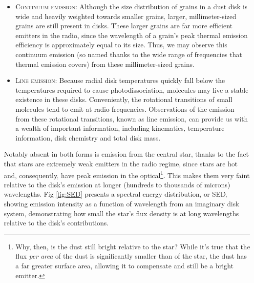 \begin{itemize}


  \item \textsc{Continuum emission}: Although the size distribution of grains in a dust disk is wide and heavily weighted towards smaller grains, larger, millimeter-sized grains are still present in disks. These larger grains are far more efficient emitters in the radio, since the wavelength of a grain's peak thermal emission efficiency is approximately equal to its size. Thus, we may observe this continuum emission (so named thanks to the wide range of frequencies that thermal emission covers) from these millimeter-sized grains.


  \item \textsc{Line emission}: Because radial disk temperatures quickly fall below the temperatures required to cause photodissociation, molecules may live a stable existence in these disks. Conveniently, the rotational transitions of small molecules tend to emit at radio frequencies. Observations of the emission from these rotational transitions, known as line emission, can provide us with a wealth of important information, including kinematics, temperature information, disk chemistry and total disk mass.
\end{itemize}


Notably absent in both forms is emission from the central star, thanks to the fact that stars are extremely weak emitters in the radio regime, since stars are hot and, consequently, have peak emission in the optical\footnote{Why, then, is the dust still bright relative to the star? While it's true that the flux \textit{per area} of the dust is significantly smaller than of the star, the dust has a far greater surface area, allowing it to compensate and still be a bright emitter.}. This makes them very faint relative to the disk's emission at longer (hundreds to thousands of microns) wavelengths. Fig \ref{fig:SED} \citep{Hughes2010} presents a spectral energy distribution, or SED, showing emission intensity as a function of wavelength from an imaginary disk system, demonstrating how small the star's flux density is at long wavelengths relative to the disk's contributions.


